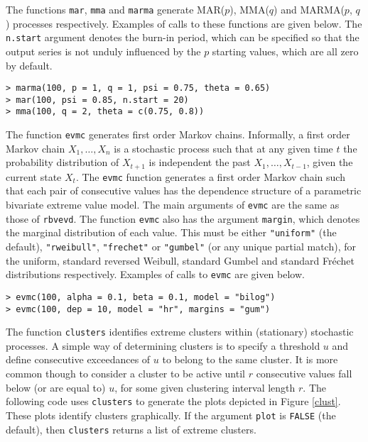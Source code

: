 \documentclass[11pt,a4paper]{article}
\begin{document}
The functions \verb+mar+, \verb+mma+ and \verb+marma+ generate MAR($p$), MMA($q$) and MARMA($p$, $q$) processes respectively.
Examples of calls to these functions are given below.
The \verb+n.start+ argument denotes the burn-in period, which can be specified so that the output series is not unduly influenced by the $p$ starting values, which are all zero by default.

\begin{verbatim}
> marma(100, p = 1, q = 1, psi = 0.75, theta = 0.65)
> mar(100, psi = 0.85, n.start = 20)
> mma(100, q = 2, theta = c(0.75, 0.8))
\end{verbatim}

The function \verb+evmc+ generates first order Markov chains.
Informally, a first order Markov chain $X_1, \ldots, X_n$ is a stochastic process such that at any given time $t$ the probability distribution of $X_{t+1}$ is independent the past $X_1, \ldots, X_{t-1}$, given the current state $X_t$.
The \verb+evmc+ function generates a first order Markov chain such that each pair of consecutive values has the dependence structure of a parametric bivariate extreme value model.
The main arguments of \verb+evmc+ are the same as those of \verb+rbvevd+.
The function \verb+evmc+ also has the argument \verb+margin+, which denotes the marginal distribution of each value.
This must be either \verb+"uniform"+ (the default), \verb+"rweibull"+, \verb+"frechet"+ or \verb+"gumbel"+ (or any unique partial match), for the uniform, standard reversed Weibull, standard Gumbel and standard Fr\'{e}chet distributions respectively.
Examples of calls to \verb+evmc+ are given below.

\begin{verbatim}
> evmc(100, alpha = 0.1, beta = 0.1, model = "bilog")
> evmc(100, dep = 10, model = "hr", margins = "gum")
\end{verbatim}

The function \verb+clusters+ identifies extreme clusters within (stationary) stochastic processes. A simple way of determining clusters is to specify a threshold $u$ and define consecutive exceedances of $u$ to belong to the same cluster.
It is more common though to consider a cluster to be active until $r$ consecutive values fall below (or are equal to) $u$, for some given clustering interval length $r$.
The following code uses \verb+clusters+ to generate the plots depicted in Figure \ref{clust}. 
These plots identify clusters graphically.
If the argument \verb+plot+ is \verb+FALSE+ (the default), then \verb+clusters+ returns a list of extreme clusters.        
\end{document}

